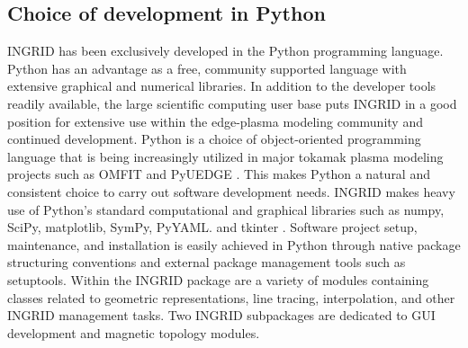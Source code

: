 \subsection{\label{sec:level2}Choice of development in Python}

INGRID has been exclusively developed in the Python programming
language. Python has an advantage as a free, community supported
language with extensive graphical and numerical libraries. In addition
to the developer tools readily available, the large scientific
computing user base puts INGRID in a good position for extensive use
within the edge-plasma modeling community and continued
development. Python is a choice of object-oriented programming
language that is being increasingly utilized in major tokamak plasma
modeling projects such as OMFIT \cite{Meneghini_2015,
  Orso_MENEGHINI2013} and PyUEDGE \cite{PyUEDGE}. This makes Python a
natural and consistent choice to carry out software development
needs. INGRID makes heavy use of Python's standard computational and graphical libraries such as numpy, SciPy, matplotlib, SymPy, PyYAML.
and tkinter \cite{numpy_5725236, virtanen2019scipy,
  matplotlib_4160265, PyYAML}. Software project setup, maintenance, and
installation is easily achieved in Python through native package
structuring conventions and external package management tools such as
setuptools.  Within the INGRID package are a variety of modules
containing classes related to geometric representations, line tracing,
interpolation, and other INGRID management tasks. Two INGRID
subpackages are dedicated to GUI development and magnetic topology
modules.
